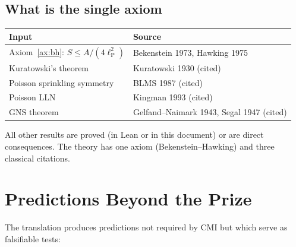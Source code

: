 \documentclass[11pt]{article}
\newcommand{\lP}{\ell_{\mathrm{P}}}
\begin{document}
\subsection{What is the single axiom}

\begin{center}
\renewcommand{\arraystretch}{1.3}
\begin{tabular}{ll}
\toprule
\textbf{Input} & \textbf{Source} \\
\midrule
Axiom~\ref{ax:bh}: $S \le A/(4\lP^2)$ &
  Bekenstein 1973, Hawking 1975 \\
Kuratowski's theorem &
  Kuratowski 1930 (cited) \\
Poisson sprinkling symmetry &
  BLMS 1987 (cited) \\
Poisson LLN &
  Kingman 1993 (cited) \\
GNS theorem &
  Gelfand--Naimark 1943, Segal 1947 (cited) \\
\bottomrule
\end{tabular}
\end{center}

All other results are proved (in Lean or in this document)
or are direct consequences.  The theory has one axiom
(Bekenstein--Hawking) and three classical citations.


\section{Predictions Beyond the Prize}
\label{sec:predictions}

The translation produces predictions not required by CMI but
which serve as falsifiable tests:
\end{document}
